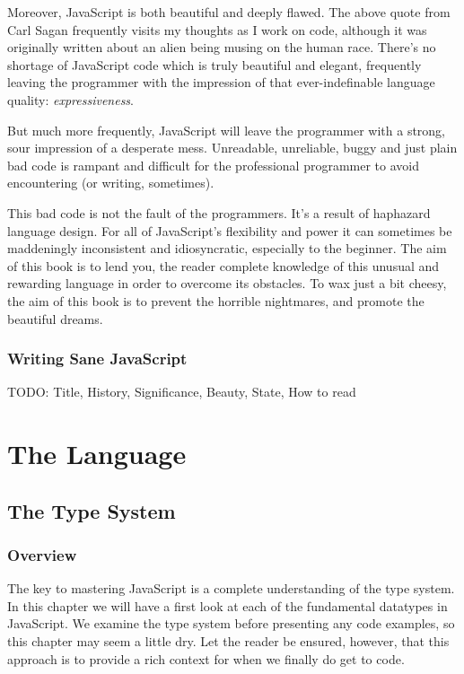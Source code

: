 \documentclass[11pt,letter]{book}
\begin{document}
    Moreover, JavaScript is both beautiful and deeply flawed. The above quote from Carl Sagan 
    frequently visits my thoughts as I work on code, although it was originally written about an 
    alien being musing on the human race. There's no shortage of JavaScript code which is truly 
    beautiful and elegant, frequently leaving the programmer with the impression of that 
    ever-indefinable language quality: \emph{expressiveness}.
    
    But much more frequently, JavaScript will leave the programmer with a strong, sour impression of 
    a desperate mess. Unreadable, unreliable, buggy and just plain bad code is rampant and difficult 
    for the professional programmer to avoid encountering (or writing, sometimes).
    
    This bad code is not the fault of the programmers. It's a result of haphazard language design. 
    For all of JavaScript's flexibility and power it can sometimes be maddeningly inconsistent and 
    idiosyncratic, especially to the beginner. The aim of this book is to lend you, the reader 
    complete knowledge of this unusual and rewarding language in order to overcome its obstacles. To 
    wax just a bit cheesy, the aim of this book is to prevent the horrible nightmares, and promote 
    the beautiful dreams.
    
    \section*{Writing Sane JavaScript}
    
    
    TODO: Title, History, Significance, Beauty, State, How to read
    
    \mainmatter
    
    \part{The Language}
    \chapter{The Type System}
    \section{Overview}
    The key to mastering JavaScript is a complete understanding of the type system. In this chapter
    we will have a first look at each of the fundamental datatypes in JavaScript. We examine the 
    type system before presenting any code examples, so this chapter may seem a little dry. Let the 
    reader be ensured, however, that this approach is to provide a rich context for when we finally
    do get to code.
    
\end{document}
